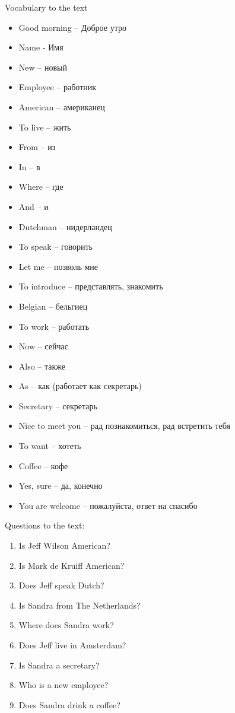 \documentclass{tstextbook}
\begin{document}
\begin{example} Vocabulary to the text
	\label{def:vocabulary_1}
	\begin{itemize}
		\item Good morning -- Доброе утро
		\item Name - Имя
		\item New -- новый
		\item Employee -- работник
		\item American -- американец
		\item To live -- жить	
		\item From -- из
		\item In -- в
		\item Where -- где
		\item And -- и
		\item Dutchman -- нидерландец
		\item To speak -- говорить
		\item Let me -- позволь мне
		\item To introduce -- представлять, знакомить
		\item Belgian -- бельгиец
		\item To work -- работать
		\item Now -- сейчас
		\item Also -- также
		\item As -- как (работает как секретарь)
		\item Secretary -- секретарь
		\item Nice to meet you -- рад познакомиться, рад встретить тебя
		\item To want -- хотеть
		\item Coffee -- кофе
		\item Yes, sure -- да, конечно
		\item You are welcome -- пожалуйста, ответ на спасибо
	\end{itemize}
\end{example}

	Questions to the text:

	\begin{enumerate}
		\item Is Jeff Wilson American?
		\item  Is Mark de Kruiff American?
		\item Does Jeff speak Dutch?
		\item Is Sandra from The Netherlands?
		\item Where does Sandra work?
		\item Does Jeff live in Amsterdam?
		\item Is Sandra a secretary?
	    \item Who is a new employee?
	    \item Does Sandra drink a coffee?		
	\end{enumerate}
	
\end{document}
